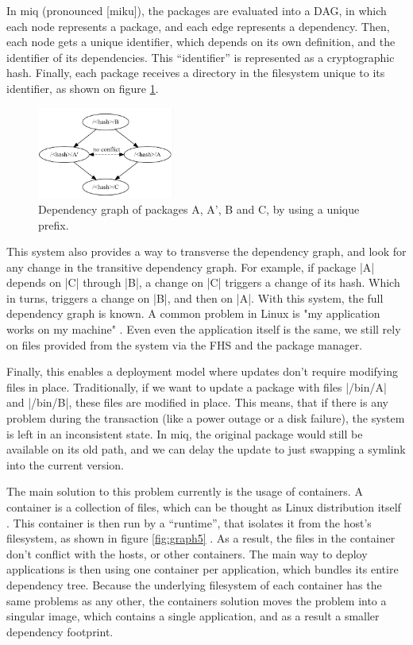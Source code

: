 In miq (pronounced [miku]), the packages are evaluated into a \ac{DAG}, in which
each node represents a package, and each edge represents a dependency. Then,
each node gets a unique identifier, which depends on its own definition, and the
identifier of its dependencies. This ``identifier'' is represented as a
cryptographic hash. Finally, each package receives a directory in the filesystem
unique to its identifier, as shown on figure \ref{fig:graph4}.


\begin{figure}
    \centering
    \includegraphics[width=0.4\textwidth]{Screenshot 2023-05-29 164148.png}
    \caption{Dependency graph of packages A, A', B and C, by using a unique prefix.}
    \label{fig:graph4}
\end{figure}



This system also provides a way to transverse the dependency graph, and look for
any change in the transitive dependency graph. For example, if package |A|
depends on |C| through |B|, a change on |C| triggers a change of its hash. Which
in turns, triggers a change on |B|, and then on |A|. With this system, the full
dependency graph is known. A common problem in Linux is "my application works on
my machine" \cite{mukherjeeFixingDependencyErrors2021}. Even even the application itself is the same, we still rely on
files provided from the system via the \ac{FHS} and the package manager.

Finally, this enables a deployment model where updates don't require modifying
files in place. Traditionally, if we want to update a package with files
|/bin/A| and |/bin/B|, these files are modified in place. This means, that if
there is any problem during the transaction (like a power outage or a disk
failure), the system is left in an inconsistent state. In miq, the original
package would still be available on its old path, and we can delay the update to
just swapping a symlink into the current version.

The main solution to this problem currently is the usage of containers. A
container is a collection of files, which can be thought as Linux distribution
itself \cite{DockerAcceleratedContainerized2022} \cite{merkelDockerLightweightLinux2014}. This container is then run by a ``runtime'', that isolates it from the
host's filesystem, as shown in figure \ref{fig:graph5} . As a result, the files in the container don't conflict with
the hosts, or other containers. The main way to deploy applications is then
using one container per application, which bundles its entire dependency tree.
Because the underlying filesystem of each container has the same problems as any
other, the containers solution moves the problem into a singular image, which
contains a single application, and as a result a smaller dependency footprint.

